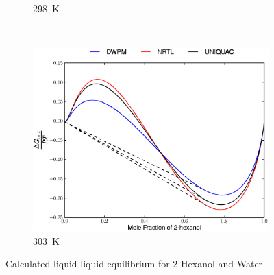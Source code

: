 \begin{figure}[hp]
\begin{subfigure}[h]{0.5\textwidth}
	\caption{298~$\mathrm{K}$}
\end{subfigure}%
\\%
\begin{subfigure}[h]{0.5\textwidth}
	\centering
	\includegraphics[width = \textwidth]{Results_Parts/BinaryParams/2-hexanol-water/AllModelsGibbsPlots/T_303.eps}
	\caption{303~$\mathrm{K}$} 
\end{subfigure}%
\caption{Calculated liquid-liquid equilibrium for 2-Hexanol and Water}
\end{figure}
\clearpage
